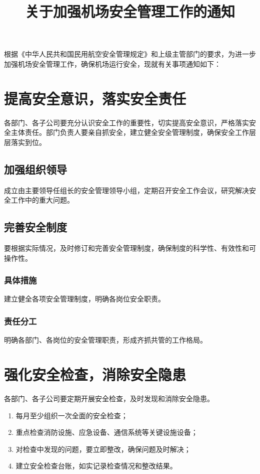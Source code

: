 \documentclass{common-doc}
\title{关于加强机场安全管理工作的通知}
\begin{document}
\maketitle

根据《中华人民共和国民用航空安全管理规定》和上级主管部门的要求，为进一步加强机场安全管理工作，确保机场运行安全，现就有关事项通知如下：

\section{提高安全意识，落实安全责任}
各部门、各子公司要充分认识安全工作的重要性，切实提高安全意识，严格落实安全主体责任。部门负责人要亲自抓安全，建立健全安全管理制度，确保安全工作层层落实到位。

\subsection{加强组织领导}
成立由主要领导任组长的安全管理领导小组，定期召开安全工作会议，研究解决安全工作中的重大问题。

\subsection*{完善安全制度}
要根据实际情况，及时修订和完善安全管理制度，确保制度的科学性、有效性和可操作性。

\subsubsection{具体措施}
建立健全各项安全管理制度，明确各岗位安全职责。

\subsubsection*{责任分工}
明确各部门、各岗位的安全管理职责，形成齐抓共管的工作格局。

\section{强化安全检查，消除安全隐患}
各部门、各子公司要定期开展安全检查，及时发现和消除安全隐患。

\begin{enumerate}
\item 每月至少组织一次全面的安全检查；
\item 重点检查消防设施、应急设备、通信系统等关键设施设备；
\item 对检查中发现的问题，要立即整改，确保问题及时解决；
\item 建立安全检查台账，如实记录检查情况和整改结果。
\end{enumerate}
\end{document}

